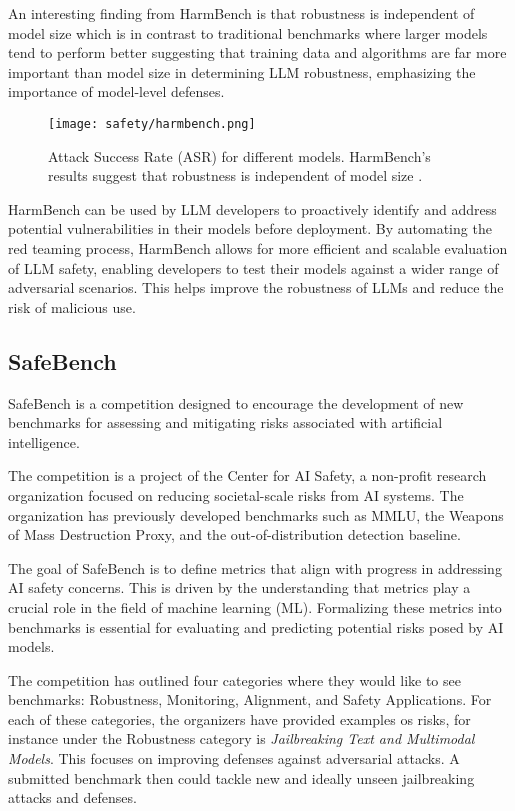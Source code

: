 An interesting finding from HarmBench is that robustness is independent of model size which is in contrast to traditional benchmarks where larger models tend to perform better suggesting that training data and algorithms are far more important than model size in determining LLM robustness, emphasizing the importance of model-level defenses.

\begin{figure}[H]
\centering
\texttt{[image: safety/harmbench.png]}
\caption{Attack Success Rate (ASR) for different models. HarmBench's results suggest that robustness is independent of model size \cite{mazeika2024harmbenchstandardizedevaluationframework}.}
\label{fig:harmbench}
\end{figure}

HarmBench can be used by LLM developers to proactively identify and address potential vulnerabilities in their models before deployment. By automating the red teaming process, HarmBench allows for more efficient and scalable evaluation of LLM safety, enabling developers to test their models against a wider range of adversarial scenarios. This helps improve the robustness of LLMs and reduce the risk of malicious use.

\subsection{SafeBench}

SafeBench  is a competition designed to encourage the development of new benchmarks for assessing and mitigating risks associated with artificial intelligence.

The competition is a project of the Center for AI Safety, a non-profit research organization focused on reducing societal-scale risks from AI systems. The organization has previously developed benchmarks such as MMLU, the Weapons of Mass Destruction Proxy, and the out-of-distribution detection baseline.

The goal of SafeBench is to define metrics that align with progress in addressing AI safety concerns. This is driven by the understanding that metrics play a crucial role in the field of machine learning (ML). Formalizing these metrics into benchmarks is essential for evaluating and predicting potential risks posed by AI models.

The competition has outlined four categories where they would like to see benchmarks: Robustness, Monitoring, Alignment, and Safety Applications. For each of these categories, the organizers have provided examples os risks, for instance under the Robustness category is \textit{Jailbreaking Text and Multimodal Models}. This focuses on improving defenses against adversarial attacks. A submitted benchmark then could tackle new and ideally unseen jailbreaking attacks and defenses.


